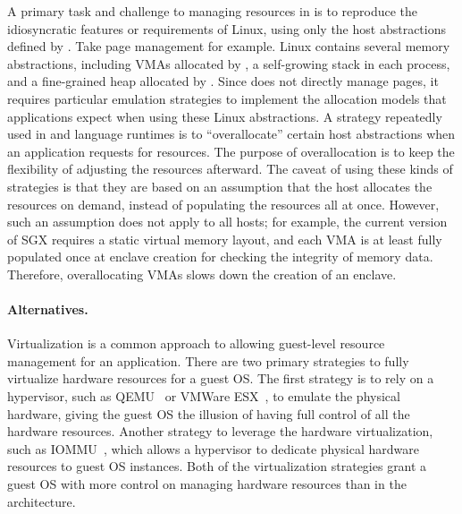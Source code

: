 A primary task and challenge to managing resources in \thelibos{}
is to reproduce the idiosyncratic %
features or requirements of Linux, %
using only the host abstractions
defined by \thehostabi{}.
Take page management for example.
Linux contains several memory abstractions, including VMAs allocated by , a self-growing stack in each process, and a fine-grained heap allocated by .
Since \thelibos{} does not directly manage pages,
it requires particular emulation strategies to
implement the allocation models that applications expect when using these Linux abstractions.
A strategy repeatedly used in \thelibos{} and language runtimes
is to ``overallocate'' certain host abstractions when an application requests for resources.
The purpose of overallocation is
to keep the flexibility of adjusting the resources afterward.
The caveat of using these kinds of strategies
is that they are based on an assumption that the host
allocates the resources
on demand, instead of populating the resources all at once.
However, such an assumption does not apply to all hosts;
for example, the current version of SGX requires a static virtual memory layout,
and each VMA is at least fully populated once at enclave creation
for checking the integrity of memory data.
Therefore, overallocating VMAs slows down the creation of an enclave.












\paragraph{Alternatives.}
Virtualization is a common approach to allowing guest-level resource management for an application.
There are two primary strategies to fully virtualize hardware resources for a guest OS.
The first strategy is to rely on a hypervisor,
such as QEMU~\cite{qemu} or VMWare ESX~\cite{wldspurger02vmware-esx},
to emulate the physical hardware,
giving the guest OS the illusion of having full control of all the hardware resources.
Another strategy to leverage the hardware virtualization,
such as IOMMU~\cite{VT-d},
which allows a hypervisor to dedicate physical hardware resources
to guest OS instances.
Both of the virtualization strategies grant a guest OS with more control on managing hardware resources than \thelibos{} in the \graphene{} architecture.



